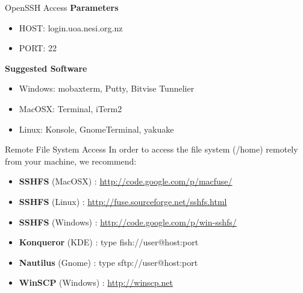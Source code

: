 \documentclass[final,t]{beamer}
\begin{document}
\begin{frame}[fragile]{}
\begin{columns}[t]
\begin{column}{.32\linewidth}
      \begin{block}{OpenSSH Access}
      \textbf{Parameters}
        \begin{itemize}
        \item HOST: login.uoa.nesi.org.nz
        \item PORT: 22
        \end{itemize}
      \textbf{Suggested Software}
        \begin{itemize}
        \item Windows: mobaxterm, Putty, Bitvise Tunnelier
        \item MacOSX: Terminal, iTerm2
        \item Linux: Konsole, GnomeTerminal, yakuake
        \end{itemize}
      \end{block}

      \begin{block}{Remote File System Access}
       In order to access the file system (/home) remotely from your machine, we recommend:
        \begin{itemize}
        \item \textbf{SSHFS} (MacOSX) : \url{http://code.google.com/p/macfuse/}
        \item \textbf{SSHFS} (Linux) : \url{http://fuse.sourceforge.net/sshfs.html}
        \item \textbf{SSHFS} (Windows) : \url{http://code.google.com/p/win-sshfs/}
        \item \textbf{Konqueror} (KDE) : type fish://user@host:port
        \item \textbf{Nautilus} (Gnome) : type sftp://user@host:port
        \item \textbf{WinSCP} (Windows) : \url{http://winscp.net}
        \end{itemize}
      \end{block}
 

\end{column}
\end{columns}
\end{frame}
\end{document}
